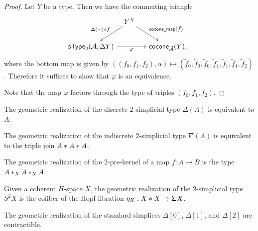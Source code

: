 \begin{proof}
Let $Y$ be a type. Then we have the commuting triangle
\begin{equation*}
\begin{tikzcd}[column sep=tiny]
\phantom{\mathsf{cocone}_{\tilde{\mathcal{A}}}(Y)} & Y^X \arrow[dl,swap,"\Delta(\blank)\circ f"] \arrow[dr,"\mathsf{cocone\usc{}map}(\tilde{f})"] & \phantom{\mathsf{sType}_2(\mathcal{A},\Delta Y)} \\
\mathsf{sType}_2(\mathcal{A},\Delta Y) \arrow[rr,swap,"\varphi"] & & \mathsf{cocone}_{\tilde{\mathcal{A}}}(Y),
\end{tikzcd}
\end{equation*}
where the bottom map is given by $((f_0,f_1,f_2),\alpha)\mapsto (\tilde f_0,\tilde f_0,\tilde f_0,\tilde f_1,\tilde f_1,\tilde f_1,\tilde f_2)$. Therefore it suffices to show that $\varphi$ is an equivalence.

Note that the map $\varphi$ factors through the type of triples $(f_0,f_1,f_2)$.
\end{proof}

\begin{cor}
The geometric realization of the discrete $2$-simplicial type $\Delta(A)$ is equivalent to $A$.
\end{cor}

\begin{cor}
The geometric realization of the indiscrete $2$-simplicial type $\nabla(A)$ is equivalent to the triple join $\join{A}{\join{A}{A}}$. 
\end{cor}

\begin{cor}\label{cor:2-pre-kernel}
The geometric realization of the $2$-pre-kernel of a map $f:A\to B$ is the type $\join[X]{A}{\join[X]{A}{A}}$. 
\end{cor}

\begin{cor}\label{cor:geom_hspace}
Given a coherent $H$-space $X$, the geometric realization of the $2$-simplicial type $S^2 X$ is the cofiber of the Hopf fibration $\eta_X: \join{X}{X} \to \susp X$.
\end{cor}

\begin{cor}
The geometric realization of the standard simplices $\Delta[0]$, $\Delta[1]$, and $\Delta[2]$ are contractible.
\end{cor}

